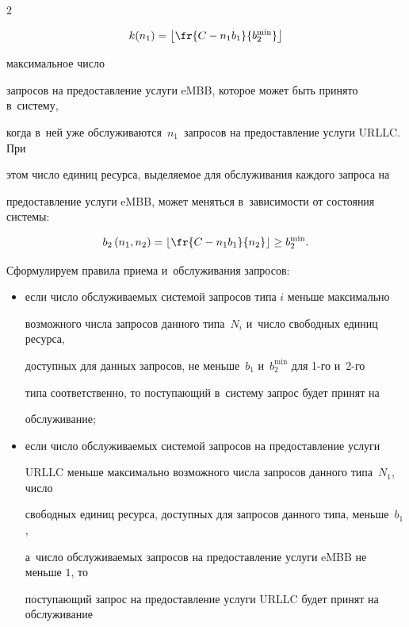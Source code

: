 \begin{multicols}{2}
\noindent


$$


k(n_1) = \left\lfloor \fr{C-n_1 b_1}{b_2^{\min}}\right \rfloor


$$ 


максимальное чис\-ло 


запросов на предостав\-ле\-ние услуги \mbox{eMBB}, которое может быть принято в~сис\-те\-му, 


когда в~ней уже обслуживаются~$n_1$~запросов на предостав\-ле\-ние услуги URLLC. При 


этом чис\-ло единиц ресурса, выделяемое для обслуживания каждого запроса на 


предостав\-ле\-ние услуги eMBB, может меняться в~за\-ви\-си\-мости от со\-сто\-яния сис\-темы: 





\noindent


$$


b_2\left(n_1,n_2\right) = \left\lfloor \fr{C-n_1 b_1}{n_2} \right\rfloor \geq b_2^{\min}.


$$





Сформулируем правила приема и~обслуживания запросов:


\begin{itemize}


    \item если число обслуживаемых сис\-те\-мой запросов типа $i$ меньше максимально 


возможного чис\-ла запросов данного типа~$N_i$ и~чис\-ло свободных единиц ресурса, 


доступных для данных запросов, не меньше~$b_1$ и~$b_2^{\min}$ для 1-го и~2-го 


типа соответственно, то поступающий в~сис\-те\-му запрос будет принят на 


обслуживание;


    \item если число обслуживаемых сис\-те\-мой запросов на предостав\-ле\-ние услуги 


URLLC меньше максимально возможного чис\-ла запросов данного типа~$N_1$, чис\-ло 


свободных единиц ресурса, доступных для запросов данного типа, меньше~$b_1$, 


а~чис\-ло обслуживаемых запросов на предостав\-ле\-ние услуги eMBB не меньше $1$, то 


по\-сту\-па\-ющий запрос на предостав\-ле\-ние услуги URLLC будет принят на обслуживание 



\end{itemize}
\end{multicols}
